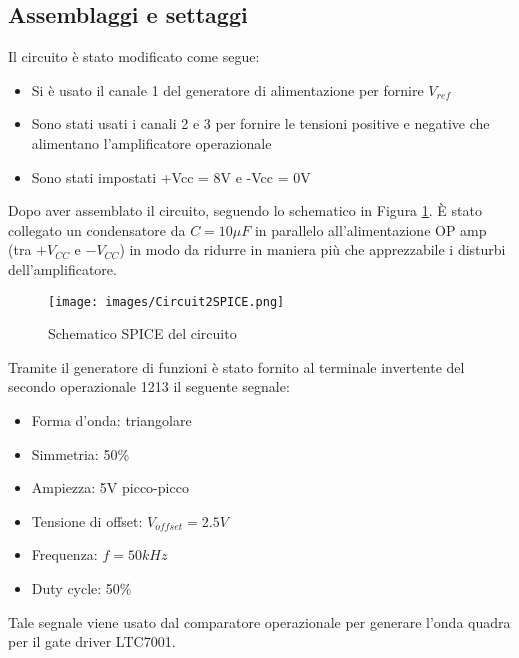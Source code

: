 \subsection{Assemblaggi e settaggi}
Il circuito è stato modificato come segue:
\begin{itemize}
    \item Si è usato il canale 1 del generatore di alimentazione per fornire $V_{ref}$
    \item Sono stati usati i canali 2 e 3 per fornire le tensioni positive e negative che alimentano l'amplificatore operazionale
    \item Sono stati impostati +Vcc = 8V e -Vcc = 0V
\end{itemize}    
Dopo aver assemblato il circuito, seguendo lo schematico in Figura \ref{fig:Circuit2SPICE}. È stato collegato un condensatore da $C=10\mu F$ in parallelo all'alimentazione OP amp (tra $+V_{CC}$ e $-V_{CC}$) in modo da ridurre in maniera più che apprezzabile i disturbi dell'amplificatore.
\begin{figure}[H]
    \centering
    \texttt{[image: images/Circuit2SPICE.png]}
    \caption{Schematico SPICE del circuito}
    \label{fig:Circuit2SPICE}
\end{figure}
Tramite il generatore di funzioni è stato fornito al terminale invertente del secondo operazionale 1213 il seguente segnale:
\begin{itemize}
    \item Forma d'onda: triangolare
    \item Simmetria: 50\%
    \item Ampiezza: 5V picco-picco
    \item Tensione di offset: $V_{offset}=2.5V$
    \item Frequenza: $f=50kHz$
    \item Duty cycle: 50\%
\end{itemize}
Tale segnale viene usato dal comparatore operazionale per generare l'onda quadra per il gate driver LTC7001.
\clearpage






